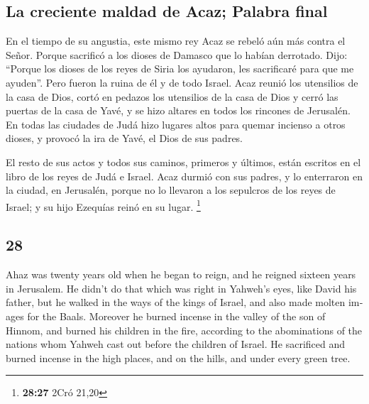 \begin{paracol}{2}
\hypertarget{la-creciente-maldad-de-acaz-palabra-final}{%
\subsection{La creciente maldad de Acaz; Palabra
final}\label{la-creciente-maldad-de-acaz-palabra-final}}

 En el tiempo de su angustia, este mismo rey Acaz se
rebeló aún más contra el Señor.  Porque sacrificó a los
dioses de Damasco que lo habían derrotado. Dijo: ``Porque los dioses de
los reyes de Siria los ayudaron, les sacrificaré para que me ayuden''.
Pero fueron la ruina de él y de todo Israel.  Acaz reunió
los utensilios de la casa de Dios, cortó en pedazos los utensilios de la
casa de Dios y cerró las puertas de la casa de Yavé, y se hizo altares
en todos los rincones de Jerusalén.  En todas las
ciudades de Judá hizo lugares altos para quemar incienso a otros dioses,
y provocó la ira de Yavé, el Dios de sus padres.

 El resto de sus actos y todos sus caminos, primeros y
últimos, están escritos en el libro de los reyes de Judá e Israel.
 Acaz durmió con sus padres, y lo enterraron en la
ciudad, en Jerusalén, porque no lo llevaron a los sepulcros de los reyes
de Israel; y su hijo Ezequías reinó en su lugar. \footnote{\textbf{28:27}
  2Cró 21,20}

\switchcolumn
\begin{otherlanguage}{english}

\hypertarget{section-55}{%
\section{28}\label{section-55}}

 Ahaz was twenty years old when he began to reign, and he
reigned sixteen years in Jerusalem. He didn't do that which was right in
Yahweh's eyes, like David his father,  but he walked in
the ways of the kings of Israel, and also made molten images for the
Baals.  Moreover he burned incense in the valley of the
son of Hinnom, and burned his children in the fire, according to the
abominations of the nations whom Yahweh cast out before the children of
Israel.  He sacrificed and burned incense in the high
places, and on the hills, and under every green tree.


\end{otherlanguage}
\end{paracol}
